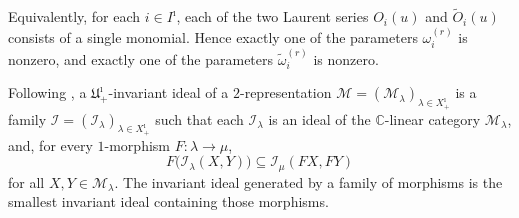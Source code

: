 \documentclass[a4,10pt]{amsart}
\numberwithin{equation}{section}
\theoremstyle{definition}
\begin{document}
Equivalently, for each $i\in I^\imath$, each of the two Laurent series
$O_i(u)$ and $\tilde O_i(u)$ consists of   a single monomial. Hence exactly one
of the parameters $\omega_i^{(r)}$ is nonzero, and exactly one of the parameters
$\tilde\omega_i^{(r)}$ is nonzero.



Following \cite[Section~2.6]{MM}, a 
\(\mathfrak U^\imath_+\)-invariant ideal of a \(2\)-representation
\(
  \mathcal M
  =
  (\mathcal M_\lambda)_{\lambda\in X^\imath_+}
\)
is a family
\(
  \mathcal I
  =
  (\mathcal I_\lambda)_{\lambda\in X^\imath_+}
\)
such that each \(\mathcal I_\lambda\) is an ideal of the
\(\mathbb C\)-linear category \(\mathcal M_\lambda\), and, for every
\(1\)-morphism \(F\colon\lambda\to\mu\),
\[
  F\bigl(\mathcal I_\lambda(X,Y)\bigr)
  \subseteq
  \mathcal I_\mu(FX,FY)
\]
for all \(X,Y\in\mathcal M_\lambda\).
The invariant ideal generated by a family of morphisms is the smallest
invariant ideal containing those morphisms.
\end{document}
